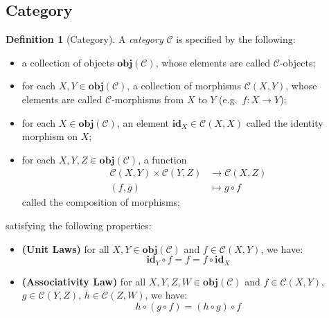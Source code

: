 \documentclass[12pt,twoside,a4paper]{report}
\theoremstyle{definition}
\newtheorem{definition}{Definition}
\theoremstyle{definition}
\theoremstyle{definition}
\theoremstyle{definition}
\begin{document}
        \subsection{Category}
        \begin{definition}[Category]
            A \emph{category} $\mathcal{C}$ is specified by the following:
            \begin{itemize}
                \item 
                    a collection of objects $\textbf{obj}(\mathcal{C})$, whose elements are called $\mathcal{C}$-objects;
                \item 
                    for each $X, Y \in \textbf{obj}(\mathcal{C})$, a collection of morphisms $\mathcal{C}{(X,Y)}$, whose elements are called $\mathcal{C}$-morphisms from $X$ to $Y$ (e.g.\ $f : X \to Y$);
                \item 
                    for each $X \in \textbf{obj}(\mathcal{C})$, an element $\textbf{id}_X \in \mathcal{C}{(X,X)}$ called the identity morphism on $X$;
                \item 
                    for each $X, Y, Z \in \textbf{obj}(\mathcal{C})$, a function 
                    \[\begin{aligned}
                        \mathcal{C}{(X,Y)} \times \mathcal{C}{(Y,Z)} &\to \mathcal{C}{(X,Z)} \\
                        (f,g) &\mapsto g \circ f
                    \end{aligned}\]
                    called the composition of morphisms;
            \end{itemize}
            satisfying the following properties:
            \begin{itemize}
                \item 
                    \textbf{(Unit Laws)}
                    for all $X, Y \in \textbf{obj}(\mathcal{C})$ and $f \in \mathcal{C}{(X,Y)}$, we have:
                    \begin{equation} \label{law: unit}
                        \textbf{id}_Y \circ f = f = f \circ \textbf{id}_X
                    \end{equation}
                \item
                    \textbf{(Associativity Law)}
                    for all $X, Y, Z, W \in \textbf{obj}(\mathcal{C})$ and $f \in \mathcal{C}{(X,Y)}$, $g \in \mathcal{C}{(Y,Z)}$, $h \in \mathcal{C}{(Z,W)}$, we have:
                    \begin{equation} \label{law: associativity}
                        h \circ (g \circ f) = (h \circ g) \circ f
                    \end{equation}
            \end{itemize}
        \end{definition}
\end{document}
